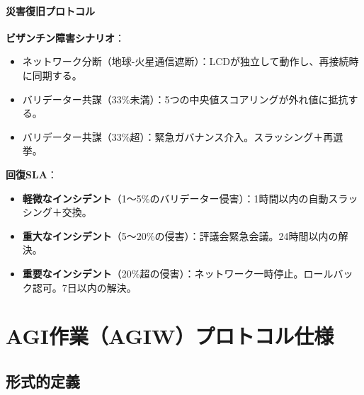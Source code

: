 \documentclass[11pt]{article}
\begin{document}
\paragraph{災害復旧プロトコル}
\textbf{ビザンチン障害シナリオ}：
\begin{itemize}[noitemsep]
  \item ネットワーク分断（地球-火星通信遮断）：LCDが独立して動作し、再接続時に同期する。
  \item バリデーター共謀（33\%未満）：5つの中央値スコアリングが外れ値に抵抗する。
  \item バリデーター共謀（33\%超）：緊急ガバナンス介入。スラッシング＋再選挙。
\end{itemize}

\textbf{回復SLA}：
\begin{itemize}[noitemsep]
  \item \textbf{軽微なインシデント}（1〜5\%のバリデーター侵害）：1時間以内の自動スラッシング＋交換。
  \item \textbf{重大なインシデント}（5〜20\%の侵害）：評議会緊急会議。24時間以内の解決。
  \item \textbf{重要なインシデント}（20\%超の侵害）：ネットワーク一時停止。ロールバック認可。7日以内の解決。
\end{itemize}

\section{AGI作業（AGIW）プロトコル仕様}
\label{sec:agiw-spec}

\subsection{形式的定義}
\end{document}
